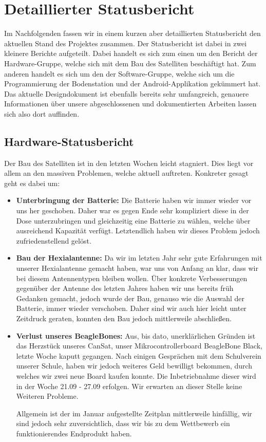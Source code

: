 \section{Detaillierter Statusbericht}
Im Nachfolgenden fassen wir in einem kurzen aber detaillierten Statusbericht den aktuellen Stand des Projektes zusammen. Der Statusbericht ist dabei in zwei kleinere Berichte aufgeteilt. Dabei handelt es sich zum einen um den Bericht der Hardware-Gruppe, welche sich mit dem Bau des Satelliten beschäftigt hat. Zum anderen handelt es sich um den der Software-Gruppe, welche sich um die Programmierung der Bodenstation und der Android-Applikation gekümmert hat. Das aktuelle Designdokument ist ebenfalls bereits sehr umfangreich, genauere Informationen über unsere abgeschlossenen und dokumentierten Arbeiten lassen sich also dort auffinden.

\subsection{Hardware-Statusbericht}
Der Bau des Satelliten ist in den letzten Wochen leicht stagniert. Dies liegt vor allem an den massiven Problemen, welche aktuell auftreten. Konkreter gesagt geht es dabei um:

\begin{itemize}
\item \textbf{Unterbringung der Batterie:} Die Batterie haben wir immer wieder vor uns her geschoben. Daher war es gegen Ende sehr kompliziert diese  in der Dose unterzubringen und gleichzeitig eine Batterie zu wählen, welche über ausreichend Kapazität verfügt. Letztendlich haben wir dieses Problem jedoch zufriedenstellend gelöst.
\item \textbf{Bau der Hexialantenne:} Da wir im letzten Jahr sehr gute Erfahrungen mit unserer Hexialantenne gemacht haben, war uns von Anfang an klar, dass wir bei diesem Antennentypen bleiben wollen. Über konkrete Verbesserungen gegenüber der Antenne des letzten Jahres haben wir uns bereits früh Gedanken gemacht, jedoch wurde der Bau, genauso wie die Auswahl der Batterie, immer wieder verschoben. Daher sind wir auch hier leicht unter Zeitdruck geraten, konnten den Bau jedoch mittlerweile abschließen.
\item \textbf{Verlust unseres BeagleBones:} Aus, bis dato, unerklärlichen Gründen ist das Herzstück unseres CanSat, unser Mikrocontrollerboard BeagleBone Black, letzte Woche kaputt gegangen. Nach einigen Gesprächen mit dem Schulverein unserer Schule, haben wir jedoch weiteres Geld bewilligt bekommen, durch welches wir zwei neue Board kaufen konnte. Die Inbetriebnahme dieser wird in der Woche 21.09 - 27.09 erfolgen. Wir erwarten an dieser Stelle keine Weiteren Probleme.

Allgemein ist der im Januar aufgestellte Zeitplan mittlerweile hinfällig, wir sind jedoch sehr zuversichtlich, dass wir bis zu dem Wettbewerb ein funktionierendes Endprodukt haben.

\end{itemize}
